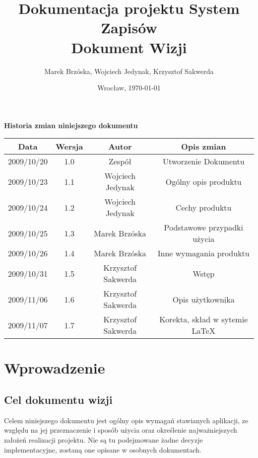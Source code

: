\documentclass[11pt,leqno]{article}
\title{\LARGE Dokumentacja projektu \textbf{System Zapisów}\\
							Dokument Wizji}
\author{Marek Brzóska, Wojciech Jedynak, Krzysztof Sakwerda}
\date{Wrocław, \today}
\begin{document}
\maketitle 

\thispagestyle{empty}
\tableofcontents

\newpage
\thispagestyle{empty}
\begin{center}
\textbf{Historia zmian niniejszego dokumentu}
\renewcommand{\arraystretch}{1.5}
\begin{tabular}{| c || c | c | c | } \hline
Data & Wersja & Autor & Opis zmian \\ \hline
2009/10/20 & 1.0 & Zespół & Utworzenie Dokumentu \\ \hline
2009/10/23 & 1.1 & Wojciech Jedynak & Ogólny opis produktu \\ \hline
2009/10/24 & 1.2 & Wojciech Jedynak & Cechy produktu \\ \hline
2009/10/25 & 1.3 & Marek Brzóska & Podstawowe przypadki użycia \\ \hline
2009/10/26 & 1.4 & Marek Brzóska & Inne wymagania produktu \\ \hline
2009/10/31 & 1.5 & Krzysztof Sakwerda & Wstęp \\ \hline
2009/11/06 & 1.6 & Krzysztof Sakwerda & Opis użytkownika \\ \hline
2009/11/07 & 1.7 & Krzysztof Sakwerda & Korekta, skład w sytemie \LaTeX \\ \hline
\end{tabular}
\end{center}

\newpage
\section{Wprowadzenie}

\subsection{Cel dokumentu wizji}
Celem niniejszego dokumentu jest ogólny opis wymagań stawianych aplikacji, ze względu na jej przeznaczenie i sposób użycia oraz określenie najważniejszych założeń realizacji projektu. Nie są tu podejmowane żadne decyzje implementacyjne, zostaną one opisane w osobnych dokumentach.
\end{document}
